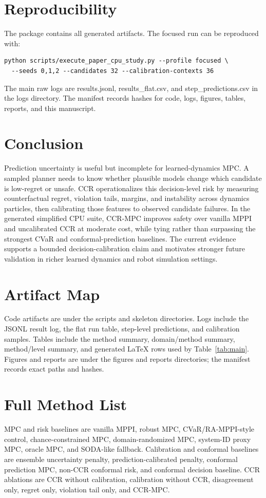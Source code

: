 \documentclass[11pt]{article}
\begin{document}
\section{Reproducibility}

The package contains all generated artifacts. The focused run can be reproduced with:
\begin{verbatim}
python scripts/execute_paper_cpu_study.py --profile focused \
  --seeds 0,1,2 --candidates 32 --calibration-contexts 36
\end{verbatim}
The main raw logs are results.jsonl, results\_flat.csv, and step\_predictions.csv in the logs directory. The manifest  records hashes for code, logs, figures, tables, reports, and this manuscript.

\section{Conclusion}

Prediction uncertainty is useful but incomplete for learned-dynamics MPC. A sampled planner needs to know whether plausible models change which candidate is low-regret or unsafe. CCR operationalizes this decision-level risk by measuring counterfactual regret, violation tails, margins, and instability across dynamics particles, then calibrating those features to observed candidate failures. In the generated simplified CPU suite, CCR-MPC improves safety over vanilla MPPI and uncalibrated CCR at moderate cost, while tying rather than surpassing the strongest CVaR and conformal-prediction baselines. The current evidence supports a bounded decision-calibration claim and motivates stronger future validation in richer learned dynamics and robot simulation settings.




\appendix
\section{Artifact Map}

Code artifacts are under the scripts and skeleton directories. Logs include the JSONL result log, the flat run table, step-level predictions, and calibration samples. Tables include the method summary, domain/method summary, method/level summary, and generated LaTeX rows used by Table~\ref{tab:main}. Figures and reports are under the figures and reports directories; the manifest records exact paths and hashes.

\section{Full Method List}

MPC and risk baselines are vanilla MPPI, robust MPC, CVaR/RA-MPPI-style control, chance-constrained MPC, domain-randomized MPC, system-ID proxy MPC, oracle MPC, and SODA-like fallback. Calibration and conformal baselines are ensemble uncertainty penalty, prediction-calibrated penalty, conformal prediction MPC, non-CCR conformal risk, and conformal decision baseline. CCR ablations are CCR without calibration, calibration without CCR, disagreement only, regret only, violation tail only, and CCR-MPC.
\end{document}
